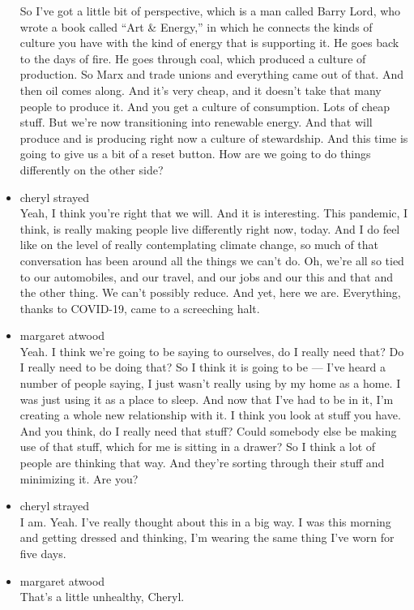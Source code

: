 \begin{itemize}
  So I've got a little bit of perspective, which is a man called Barry
  Lord, who wrote a book called ``Art \& Energy,'' in which he connects
  the kinds of culture you have with the kind of energy that is
  supporting it. He goes back to the days of fire. He goes through coal,
  which produced a culture of production. So Marx and trade unions and
  everything came out of that. And then oil comes along. And it's very
  cheap, and it doesn't take that many people to produce it. And you get
  a culture of consumption. Lots of cheap stuff. But we're now
  transitioning into renewable energy. And that will produce and is
  producing right now a culture of stewardship. And this time is going
  to give us a bit of a reset button. How are we going to do things
  differently on the other side?
\item
  cheryl strayed\\
  Yeah, I think you're right that we will. And it is interesting. This
  pandemic, I think, is really making people live differently right now,
  today. And I do feel like on the level of really contemplating climate
  change, so much of that conversation has been around all the things we
  can't do. Oh, we're all so tied to our automobiles, and our travel,
  and our jobs and our this and that and the other thing. We can't
  possibly reduce. And yet, here we are. Everything, thanks to COVID-19,
  came to a screeching halt.
\item
  margaret atwood\\
  Yeah. I think we're going to be saying to ourselves, do I really need
  that? Do I really need to be doing that? So I think it is going to be
  --- I've heard a number of people saying, I just wasn't really using
  by my home as a home. I was just using it as a place to sleep. And now
  that I've had to be in it, I'm creating a whole new relationship with
  it. I think you look at stuff you have. And you think, do I really
  need that stuff? Could somebody else be making use of that stuff,
  which for me is sitting in a drawer? So I think a lot of people are
  thinking that way. And they're sorting through their stuff and
  minimizing it. Are you?
\item
  cheryl strayed\\
  I am. Yeah. I've really thought about this in a big way. I was this
  morning and getting dressed and thinking, I'm wearing the same thing
  I've worn for five days.
\item
  margaret atwood\\
  That's a little unhealthy, Cheryl.

\end{itemize}
